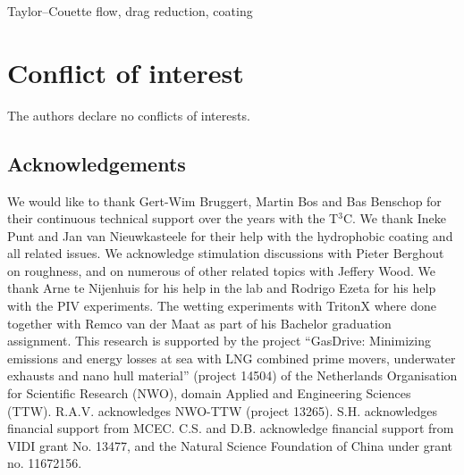 \documentclass{jfm}
\begin{document}
\begin{keywords}
Taylor--Couette flow, drag reduction, coating
\end{keywords}
%





\section*{Conflict of interest}
The authors declare no conflicts of interests.


\begin{acknowledgments}
\section*{Acknowledgements}
We would like to thank Gert-Wim Bruggert, Martin Bos and Bas Benschop for their continuous technical support over the years with the T$^3$C. We thank Ineke Punt and Jan van Nieuwkasteele for their help with the {hydrophobic} coating and all related issues. We acknowledge stimulation discussions with Pieter Berghout on roughness, and on numerous of other related topics with Jeffery Wood. We thank Arne te Nijenhuis for his help in the lab and Rodrigo Ezeta for his help with the PIV experiments. The wetting experiments with TritonX where done together with Remco van der Maat as part of his Bachelor graduation assignment. This research is supported by the project ``GasDrive: Minimizing emissions and energy losses at sea with LNG combined prime movers, underwater exhausts and nano hull material'' (project 14504) of the Netherlands Organisation for Scientific Research (NWO), domain Applied and Engineering Sciences (TTW). R.A.V. acknowledges NWO-TTW (project 13265). S.H. acknowledges financial support from MCEC. C.S. and D.B. acknowledge financial support from VIDI grant No. 13477, and the Natural Science Foundation of China under grant no. 11672156.
\end{acknowledgments}



\end{document}
